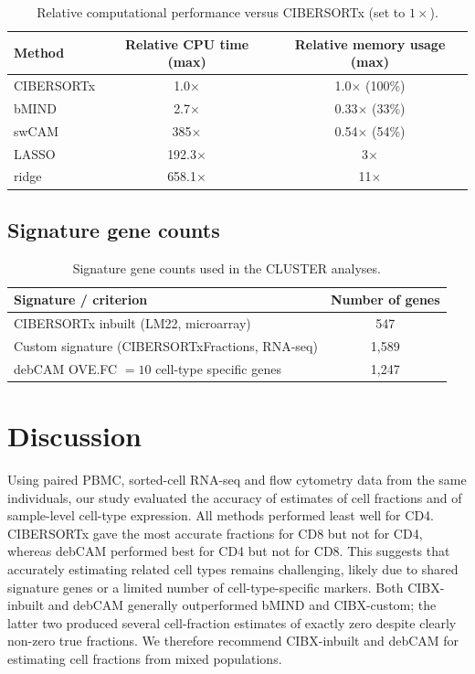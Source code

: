 \documentclass[11pt]{article}
\begin{document}
\begin{table}[htbp]
\centering
\caption{Relative computational performance versus CIBERSORTx (set to $1\times$).}
\label{tab:resources}
\begin{tabular}{lcc}
\toprule
Method & Relative CPU time (max) & Relative memory usage (max) \\
\midrule
CIBERSORTx & 1.0$\times$   & 1.0$\times$ (100\%) \\
bMIND      & 2.7$\times$   & 0.33$\times$ (33\%) \\
swCAM      & 385$\times$   & 0.54$\times$ (54\%) \\
LASSO      & 192.3$\times$ & 3$\times$           \\
ridge      & 658.1$\times$ & 11$\times$          \\
\bottomrule
\end{tabular}
\end{table}

\subsection{Signature gene counts}
\begin{table}[htbp]
\centering
\caption{Signature gene counts used in the CLUSTER analyses.}
\label{tab:sigcounts}
\begin{tabular}{lc}
\toprule
Signature / criterion & Number of genes \\
\midrule
CIBERSORTx inbuilt (LM22, microarray)          & 547   \\
Custom signature (CIBERSORTxFractions, RNA-seq) & 1{,}589 \\
debCAM OVE.FC $=10$ cell-type specific genes   & 1{,}247 \\
\bottomrule
\end{tabular}
\end{table}

\section{Discussion}
Using paired PBMC, sorted-cell RNA-seq and flow cytometry data from the same individuals, our study evaluated the accuracy of estimates of cell fractions and of sample-level cell-type expression. All methods performed least well for CD4. CIBERSORTx gave the most accurate fractions for CD8 but not for CD4, whereas debCAM performed best for CD4 but not for CD8. This suggests that accurately estimating related cell types remains challenging, likely due to shared signature genes or a limited number of cell-type-specific markers. Both CIBX-inbuilt and debCAM generally outperformed bMIND and CIBX-custom; the latter two produced several cell-fraction estimates of exactly zero despite clearly non-zero true fractions. We therefore recommend CIBX-inbuilt and debCAM for estimating cell fractions from mixed populations.
\end{document}
